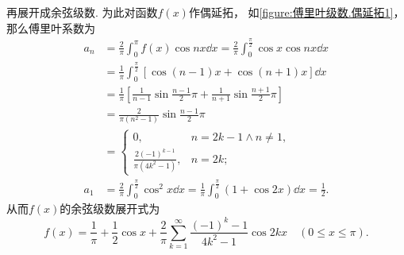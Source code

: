 \begin{example}
\begin{solution}
再展开成余弦级数.
为此对函数\(f(x)\)作偶延拓，
如\cref{figure:傅里叶级数.偶延拓1}，
那么傅里叶系数为\begin{align*}
	a_n &= \frac{2}{\pi} \int_0^\pi f(x) \cos nx \dd{x}
	= \frac{2}{\pi} \int_0^{\frac{\pi}{2}} \cos x \cos nx \dd{x} \\
	&= \frac{1}{\pi} \int_0^{\frac{\pi}{2}} [\cos(n-1)x + \cos(n+1)x] \dd{x} \\
	&= \frac{1}{\pi} \left[
			\frac{1}{n-1} \sin\frac{n-1}{2}\pi
			+ \frac{1}{n+1} \sin\frac{n+1}{2}\pi
		\right] \\
	&= \frac{2}{\pi(n^2-1)} \sin\frac{n-1}{2}\pi \\
	&= \left\{ \begin{array}{cl}
		0, & n=2k-1 \land n\neq1, \\
		\frac{2(-1)^{k-1}}{\pi(4k^2-1)}, & n=2k;
	\end{array} \right. \\
	a_1 &= \frac{2}{\pi} \int_0^{\frac{\pi}{2}} \cos^2 x \dd{x}
	= \frac{1}{\pi} \int_0^{\frac{\pi}{2}} (1+\cos 2x) \dd{x}
	= \frac{1}{2}.
\end{align*}
从而\(f(x)\)的余弦级数展开式为\[
	f(x) = \frac{1}{\pi} + \frac{1}{2} \cos x + \frac{2}{\pi}
		\sum\limits_{k=1}^\infty \frac{(-1)^k-1}{4k^2-1} \cos 2kx
	\quad(0 \leq x \leq \pi).
\]
\end{solution}
\end{example}

